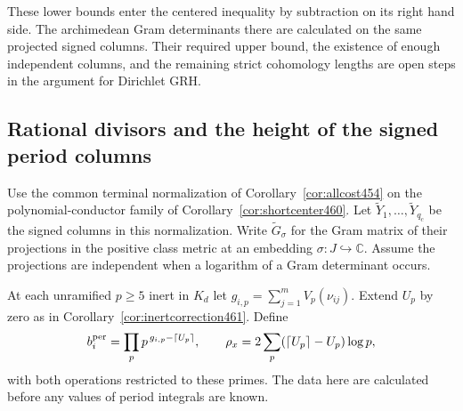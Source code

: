 \documentclass[a4paper,11pt]{article}
\theoremstyle{definition}
\theoremstyle{remark}
\numberwithin{equation}{section}
\begin{document}
These lower bounds enter the centered inequality by subtraction
on its right hand side. The archimedean Gram determinants there
are calculated on the same projected signed columns. Their
required upper bound, the existence of enough independent
columns, and the remaining strict cohomology lengths are open
steps in the argument for Dirichlet GRH.


\subsection{Rational divisors and the height of the signed period columns}
\label{sec:normalizedperiodheight463}

Use the common terminal normalization of
Corollary~\ref{cor:allcost454} on the polynomial-conductor
family of Corollary~\ref{cor:shortcenter460}. Let
\(\widetilde Y_1,\ldots,\widetilde Y_{q_c}\) be the signed
columns in this normalization. Write \(\widetilde G_\sigma\)
for the Gram matrix of their projections in the positive class
metric at an embedding \(\sigma:J\hookrightarrow\mathbb C\).
Assume the projections are independent when a logarithm of a
Gram determinant occurs.

At each unramified \(p\ge5\) inert in \(K_d\) let
\(g_{i,p}=\sum_{j=1}^m V_p(\nu_{ij})\). Extend \(U_p\) by
zero as in Corollary~\ref{cor:inertcorrection461}. Define
\[
    b_i^{\rm per}=\prod_p p^{\,g_{i,p}-\lceil U_p\rceil},
       \qquad \rho_x=2\sum_p(\lceil U_p\rceil-U_p)\log p ,
\]
with both operations restricted to these primes. The data here
are calculated before any values of period integrals are known.
\end{document}
